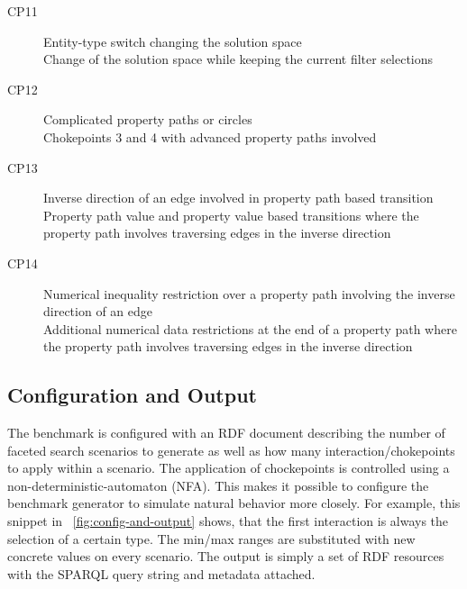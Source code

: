 \begin{description}
\item[CP11] Entity-type switch changing the solution space\\
Change of the solution space while keeping the current filter selections
\item[CP12] Complicated property paths or circles\\
Chokepoints 3 and 4 with advanced property paths involved
\item[CP13] Inverse direction of an edge involved in property path based transition\\
Property path value and property value based transitions where the property path involves traversing edges in the inverse direction
\item[CP14] Numerical inequality restriction over a property path involving the inverse direction of an edge\\
Additional numerical data restrictions at the end of a property path where the property path involves traversing edges in the inverse direction
\end{description}


\subsection{Configuration and Output}
The benchmark is configured with an RDF document describing the number of faceted search scenarios to generate as well as how many interaction/chokepoints to apply within a scenario. The application of chockepoints is controlled using a non-deterministic-automaton (NFA). This makes it possible to configure the benchmark generator to simulate natural behavior more closely. For example, this snippet in ~\autoref{fig:config-and-output} shows, that the first interaction is always the selection of a certain type. The min/max ranges are substituted with new concrete values on every scenario. The output is simply a set of RDF resources with the SPARQL query string and metadata attached.


